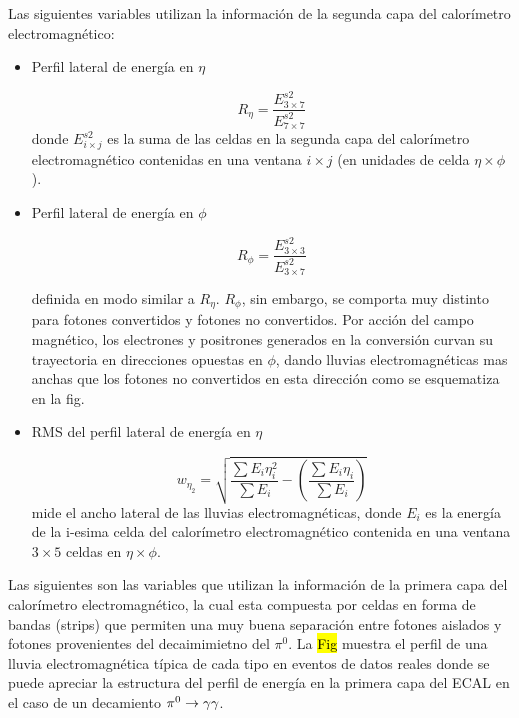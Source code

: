 Las siguientes variables utilizan la información de la segunda capa del calorímetro electromagnético:

\begin{itemize}\itemsep0.2cm\parskip0.2cm
\item Perfil lateral de energía en $\eta$

  \begin{equation}
    R_\eta = \frac{E^{s2}_{3\times 7}}{E^{s2}_{7\times 7}}
  \end{equation}
%
  donde $E^{s2}_{i\times j}$ es la suma de las celdas en la segunda capa del calorímetro
  electromagnético contenidas en una ventana $i \times j$ (en unidades de celda $\eta \times \phi$).

\item Perfil lateral de energía en $\phi$

  \begin{equation}
    R_\phi = \frac{E^{s2}_{3\times 3}}{E^{s2}_{3\times 7}}
  \end{equation}

  definida en modo similar a $R_\eta$.
  $R_\phi$, sin embargo, se comporta muy distinto para fotones convertidos y
  fotones no convertidos. Por acción del campo magnético, los electrones y positrones
  generados en la conversión curvan su trayectoria en direcciones opuestas en $\phi$,
  dando lluvias electromagnéticas mas anchas que los fotones no convertidos en esta dirección
  como se esquematiza en la fig.


  \item RMS del perfil lateral de energía en $\eta$

  \begin{equation}
    w_{\eta_2} = \sqrt{ \frac{\sum E_i \eta_i^2}{\sum E_i} - \left( \frac{\sum E_i \eta_i}{\sum E_i} \right) }
  \end{equation}
  mide el ancho lateral de las lluvias electromagnéticas, donde $E_i$ es la energía de la i-esima celda del
  calorímetro electromagnético contenida en una ventana $3 \times 5$ celdas en $\eta \times \phi$.
\end{itemize}

Las siguientes son las variables que utilizan la información de la primera capa
del calorímetro electromagnético, la cual esta compuesta por celdas en forma de
bandas (strips) que permiten una muy buena separación entre fotones aislados y
fotones provenientes del decaimimietno del $\pi^0$. La \hl{Fig} muestra el perfil de
una lluvia electromagnética típica de cada tipo en eventos de datos reales donde
se puede apreciar la estructura del perfil de energía en la primera capa del
ECAL en el caso de un decamiento $\pi^0 \to \gam\gam$.

